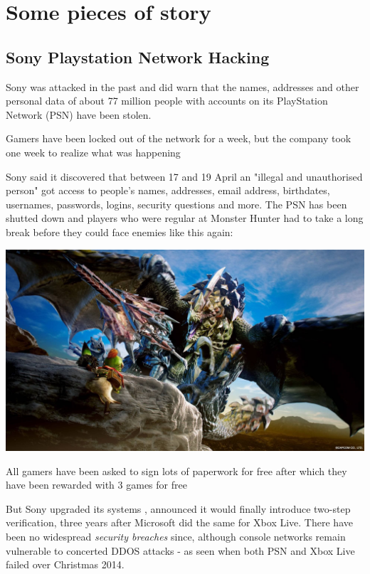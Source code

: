 \documentclass[a4paper,12pt]{article}
\begin{document}
\clearpage
\printindex

\section{Some pieces of story}
\subsection{Sony Playstation Network Hacking}

Sony was attacked in the past and did warn that the names, addresses and other personal data of about 77 million people with accounts on its PlayStation Network (PSN) have been stolen.

Gamers have been locked out of the network for a week, but the company took one week to realize what was happening

Sony said it discovered that between 17 and 19 April an "illegal and unauthorised person" got access to people's names, addresses, email address, birthdates, usernames, passwords, logins, security questions and more. The PSN has been shutted down and players who were regular at Monster Hunter had to take a long break before they could face enemies like this again:

\includegraphics[width=15cm]{./seregios.jpg}

All gamers have been asked to sign lots of paperwork for free after which they have been rewarded with 3 games for free

But Sony upgraded its systems , announced it would finally introduce two-step verification, three years after Microsoft did the same for Xbox Live. There have been no widespread \emph{security breaches} since, although console networks remain vulnerable to concerted DDOS attacks - as seen when both PSN and Xbox Live failed over Christmas 2014.
\end{document}
